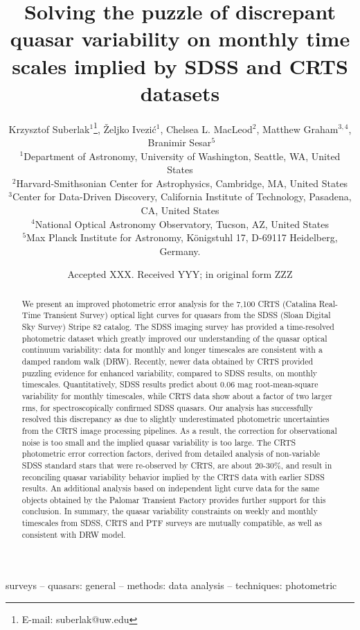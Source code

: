 \documentclass[fleqn,usenatbib]{mnras}
\title[Quasar Variability]{Solving the puzzle of discrepant quasar variability on monthly time scales implied by SDSS and CRTS datasets}
\author[K. Suberlak et al.]{
Krzysztof Suberlak$^{1}$\thanks{E-mail: suberlak@uw.edu},
\v{Z}eljko Ivezi\'c$^{1}$,
Chelsea L. MacLeod$^{2}$,
Matthew Graham$^{3,4}$, 
\newauthor
$\, \,  $Branimir Sesar$^{5}$
\\
$^{1}$Department of Astronomy, University of Washington, Seattle, WA, United States\\
$^{2}$Harvard-Smithsonian Center for Astrophysics, Cambridge, MA, United States\\
$^{3}$Center for Data-Driven Discovery, California Institute of Technology, Pasadena, CA, United States\\
$^{4}$National Optical Astronomy Observatory, Tucson, AZ, United States\\
$^{5}$Max Planck Institute for Astronomy, K\"{o}nigstuhl 17, D-69117 Heidelberg, Germany. 
}
\date{Accepted XXX. Received YYY; in original form ZZZ}
\begin{document}
\label{firstpage}
\pagerange{\pageref{firstpage}--\pageref{lastpage}}
\maketitle

\begin{abstract}
We present an improved photometric error analysis for the 7,100 CRTS (Catalina Real-Time Transient Survey)  optical  light curves for quasars from the SDSS (Sloan Digital Sky Survey) Stripe 82 catalog. The SDSS imaging survey  has provided a time-resolved photometric  dataset which greatly improved our understanding of the quasar optical continuum variability: data for monthly and longer timescales  are consistent with a damped random walk (DRW). Recently, newer data  obtained by CRTS provided  puzzling evidence for enhanced variability, compared to SDSS  results, on monthly timescales. Quantitatively, SDSS results predict  about 0.06 mag root-mean-square variability  for monthly timescales, while CRTS data show about a factor of two larger rms, for spectroscopically confirmed SDSS quasars. Our analysis has successfully resolved this discrepancy as due to slightly underestimated photometric uncertainties from the CRTS image processing pipelines. As a result, the correction for observational noise is too small and the implied quasar variability is too large. The CRTS photometric error correction factors, derived from detailed analysis of non-variable SDSS standard stars that were re-observed by CRTS, are about 20-30\%, and result in reconciling  quasar variability behavior implied by the CRTS data with earlier SDSS results. An additional analysis based on independent light curve data for the same objects obtained by the Palomar Transient Factory provides further support for this conclusion. In summary, the quasar variability constraints on weekly and monthly timescales from SDSS, CRTS and PTF surveys are mutually compatible, as well as consistent with DRW model.
\end{abstract}

\begin{keywords}
surveys -- quasars: general -- methods: data analysis -- techniques: photometric
\end{keywords}



\end{document}
